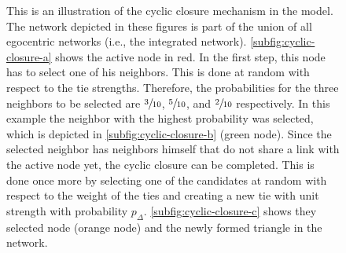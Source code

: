 \begin{figure}
    \caption[Cyclic closure mechanism example]{This is an illustration of the cyclic closure mechanism in the model. The network depicted in these figures is part of the union of all egocentric networks (i.e., the integrated network). \autoref{subfig:cyclic-closure-a} shows the active node in red. In the first step, this node has to select one of his neighbors. This is done at random with respect to the tie strengths. Therefore, the probabilities for the three neighbors to be selected are \(\sfrac{3}{10}\), \(\sfrac{5}{10}\), and \(\sfrac{2}{10}\) respectively. In this example the neighbor with the highest probability was selected, which is depicted in \autoref{subfig:cyclic-closure-b} (green node). Since the selected neighbor has neighbors himself that do not share a link with the active node yet, the cyclic closure can be completed. This is done once more by selecting one of the candidates at random with respect to the weight of the ties and creating a new tie with unit strength with probability \( p_{\Delta} \). \autoref{subfig:cyclic-closure-c} shows they selected node (orange node) and the newly formed triangle in the network.}
    \label{fig:cyclic-closure}
\end{figure}


